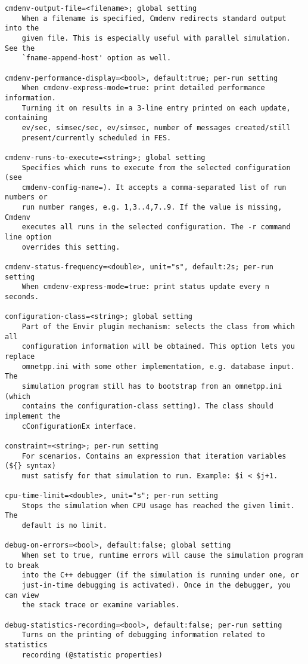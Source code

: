 \begin{verbatim}
cmdenv-output-file=<filename>; global setting
    When a filename is specified, Cmdenv redirects standard output into the
    given file. This is especially useful with parallel simulation. See the
    `fname-append-host' option as well.

cmdenv-performance-display=<bool>, default:true; per-run setting
    When cmdenv-express-mode=true: print detailed performance information.
    Turning it on results in a 3-line entry printed on each update, containing
    ev/sec, simsec/sec, ev/simsec, number of messages created/still
    present/currently scheduled in FES.

cmdenv-runs-to-execute=<string>; global setting
    Specifies which runs to execute from the selected configuration (see
    cmdenv-config-name=). It accepts a comma-separated list of run numbers or
    run number ranges, e.g. 1,3..4,7..9. If the value is missing, Cmdenv
    executes all runs in the selected configuration. The -r command line option
    overrides this setting.

cmdenv-status-frequency=<double>, unit="s", default:2s; per-run setting
    When cmdenv-express-mode=true: print status update every n seconds.

configuration-class=<string>; global setting
    Part of the Envir plugin mechanism: selects the class from which all
    configuration information will be obtained. This option lets you replace
    omnetpp.ini with some other implementation, e.g. database input. The
    simulation program still has to bootstrap from an omnetpp.ini (which
    contains the configuration-class setting). The class should implement the
    cConfigurationEx interface.

constraint=<string>; per-run setting
    For scenarios. Contains an expression that iteration variables (${} syntax)
    must satisfy for that simulation to run. Example: $i < $j+1.

cpu-time-limit=<double>, unit="s"; per-run setting
    Stops the simulation when CPU usage has reached the given limit. The
    default is no limit.

debug-on-errors=<bool>, default:false; global setting
    When set to true, runtime errors will cause the simulation program to break
    into the C++ debugger (if the simulation is running under one, or
    just-in-time debugging is activated). Once in the debugger, you can view
    the stack trace or examine variables.

debug-statistics-recording=<bool>, default:false; per-run setting
    Turns on the printing of debugging information related to statistics
    recording (@statistic properties)


\end{verbatim}
